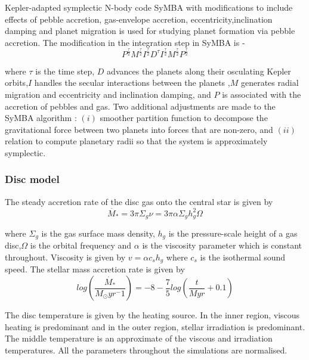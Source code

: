 Kepler-adapted symplectic N-body code SyMBA with modifications to include effects of pebble accretion, gas-envelope accretion,  eccentricity,inclination damping and planet migration is used for studying planet formation via pebble accretion. The modification in the integration step in SyMBA is - 
\begin{equation}
 P^{\frac{\tau}{2}}M^{\frac{\tau}{2}}I^{\frac{\tau}{2}}D^{\tau}I^{\frac{\tau}{2}}M^{\frac{\tau}{2}}P^{\frac{\tau}{2}}  
\end{equation}

\noindent
where $\tau$ is the time step, $D$ advances the planets along their osculating Kepler orbits,$I$ handles the secular interactions between the planets ,$M$ generates radial migration and eccentricity and inclination damping, and $P$ is associated with the accretion of pebbles and gas.
\noindent
Two additional adjustments  are made to the SyMBA algorithm : $(i)$ smoother partition function to decompose the gravitational force between two planets into forces that are non-zero, and $(ii)$ relation to compute planetary radii so that the system is approximately symplectic.   

\subsubsection{Disc model} 
The steady accretion rate of the disc gas onto the central star is given by 
\begin{equation}
\Dot{M_*} = 3\pi\Sigma_g\nu = 3\pi\alpha\Sigma_gh_g^{2}\Omega
\end{equation}

\noindent
where $\Sigma_g$ is the gas surface mass density, $h_g$ is the pressure-scale height of a gas disc,$\Omega$ is the orbital frequency and $\alpha$ is the viscosity parameter which is constant throughout. Viscosity is given by $v=\alpha c_sh_g$ where $c_s$ is the isothermal sound speed.  
The stellar mass accretion rate is given by
\begin{equation}
log(\frac{\Dot{M_*}}{M_\odot yr^-1})= -8-\frac{7}{5}log(\frac{t}{Myr} + 0.1) 
\end{equation}

\noindent
The disc temperature is given by the heating source. In the inner region, viscous heating is predominant and in the outer region, stellar irradiation is predominant. The middle temperature is an approximate  of the viscous and irradiation temperatures.
All the parameters throughout the simulations are normalised. 

